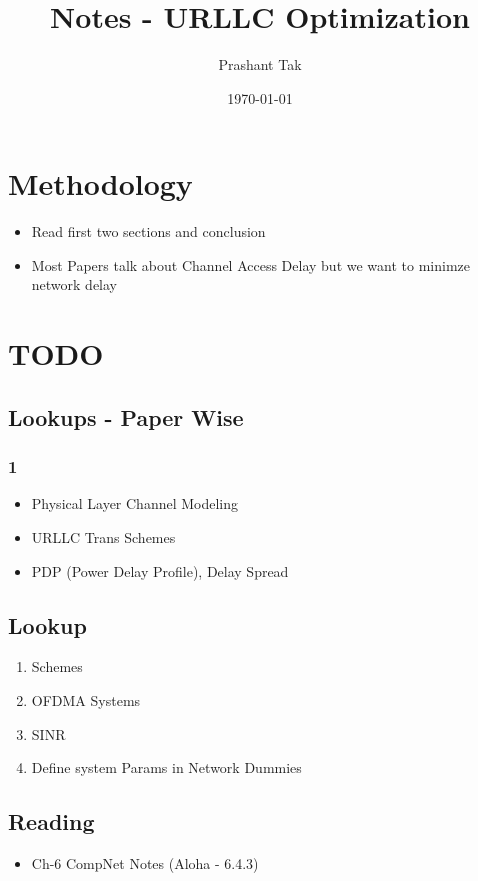 \documentclass[11pt]{article}
\author{Prashant Tak}
\date{\today}
\title{Notes - URLLC Optimization}
\begin{document}
\maketitle
\setcounter{tocdepth}{2}
\tableofcontents \clearpage
\section{Methodology}
\label{sec:org274236c}
\begin{itemize}
\item Read first two sections and conclusion
\item Most Papers talk about Channel Access Delay but we want to minimze network delay
\end{itemize}
\section{TODO}
\label{sec:orgacdd54f}
\subsection{Lookups - Paper Wise}
\label{sec:org357049f}
\subsubsection{1}
\label{sec:org4e3c9e5}
\begin{itemize}
\item Physical Layer Channel Modeling
\item URLLC Trans Schemes
\item PDP (Power Delay Profile), Delay Spread
\end{itemize}
\subsection{Lookup}
\label{sec:org1db9a3f}
\begin{enumerate}
\item Schemes
\item OFDMA Systems
\item SINR
\item Define system Params in Network Dummies
\end{enumerate}
\subsection{Reading}
\label{sec:org90f373e}
\begin{itemize}
\item Ch-6 CompNet Notes (Aloha - 6.4.3)
\end{itemize}
\end{document}
